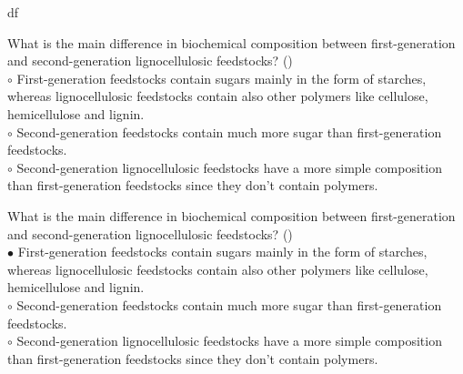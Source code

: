 df\documentclass[]{beamer}
\begin{document}
\begin{CJK}{UTF8}{gbsn}
\begin{frame}[shrink] {}
\addtocounter{questions}{1}
\color{blue}
What is the main difference in biochemical composition between first-generation and second-generation lignocellulosic feedstocks?
({})\\
\color{black}
\setlength{\parindent}{-0.4cm}
{\color{red}$\circ$}  First-generation feedstocks contain sugars mainly in the form of starches, whereas lignocellulosic feedstocks contain also other polymers like cellulose, hemicellulose and lignin.   \\
{\color{red}$\circ$} Second-generation feedstocks contain much more sugar than first-generation feedstocks.   \\
{\color{red}$\circ$} Second-generation lignocellulosic feedstocks have a more simple composition than first-generation feedstocks since they don't contain polymers.   \\
\end{frame}
\begin{frame}[shrink] {}
\addtocounter{answers}{1}
\color{blue}
What is the main difference in biochemical composition between first-generation and second-generation lignocellulosic feedstocks?
({})\\
\color{black}
\setlength{\parindent}{-0.4cm}
{\color{red}$\bullet$} First-generation feedstocks contain sugars mainly in the form of starches, whereas lignocellulosic feedstocks contain also other polymers like cellulose, hemicellulose and lignin.   \\
{\color{red}$\circ$} Second-generation feedstocks contain much more sugar than first-generation feedstocks.   \\
{\color{red}$\circ$} Second-generation lignocellulosic feedstocks have a more simple composition than first-generation feedstocks since they don't contain polymers.   \\
\end{frame}



\end{CJK}
\end{document}
